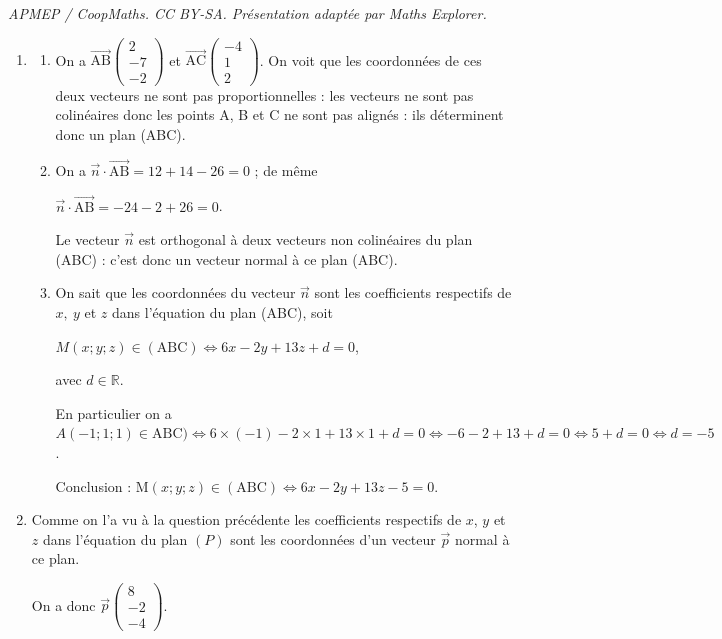 \documentclass[10pt]{article}
\providecommand{\R}{\mathbb{R}}
\providecommand{\vect}[1]{\overrightarrow{#1}}
\begin{document}
\noindent\textit{APMEP / CoopMaths. CC BY-SA. Présentation adaptée par Maths Explorer.}\par\medskip
\begin{enumerate}
	\item \begin{enumerate}
		\item On a $\vect{\text{AB}}\begin{pmatrix}2\\-7\\-2\end{pmatrix}$ et $\vect{\text{AC}}\begin{pmatrix}-4\\1\\2\end{pmatrix}$. On voit que les coordonnées de ces deux vecteurs ne sont pas proportionnelles : les vecteurs ne sont pas colinéaires donc les points A, B et C ne sont pas alignés : ils déterminent donc un plan (ABC).

		\item On a $\vect{n} \cdot \vect{\text{AB}} = 12 + 14 - 26 = 0$ ; de même

		$\vect{n} \cdot \vect{\text{AB}} = - 24 - 2 + 26 = 0$.

		Le vecteur $\vect{n}$ est orthogonal à deux vecteurs non colinéaires du plan (ABC) : c'est donc un vecteur normal à ce plan (ABC).

		\item On sait que les coordonnées du vecteur $\vect{n}$ sont les coefficients respectifs de $x, \: y$ et $z$ dans l'équation du plan (ABC), soit

		$M(x ; y ; z) \in (\text{ABC}) \iff 6x - 2y + 13z + d = 0$,

		avec $d \in \R$.

		En particulier on a $A(-1 ; 1 ; 1) \in \text{ABC}) \iff 6\times (-1) - 2\times 1 + 13\times 1 + d = 0 \iff - 6 - 2 + 13 + d = 0 \iff 5 + d = 0 \iff d = - 5$.

		Conclusion : \quad $\mathrm{M}(x ; y ; z) \in (\text{ABC}) \iff 6x - 2y + 13z - 5 = 0$.
	\end{enumerate}

	\item Comme on l'a vu à la question précédente les coefficients respectifs de $x$, $y$ et $z$ dans l'équation du plan $(P)$ sont les coordonnées d'un vecteur $\vect{p}$ normal à ce plan.

	On a donc $\vect{p}\begin{pmatrix}8\\- 2\\-4\end{pmatrix}$.


\end{enumerate}
\end{document}
